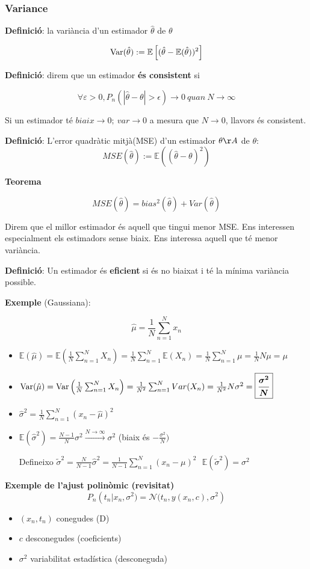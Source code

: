\subsubsection{Variance}
\textbf{Definició}: la variància d'un estimador $\hat{\theta}$ de $\theta$

$$
\operatorname{Var}(\hat{\theta}) := \mathbb{E}\left[(\hat{\theta} - \mathbb{E}(\hat{\theta}))^2\right]
$$

\textbf{Definició}: direm que un estimador \textbf{és consistent} si

$$
\forall\varepsilon>0, P_n(|\hat{\theta} - \theta| > \epsilon) \rightarrow 0\ quan\ N \to \infty
$$

Si un estimador té $biaix \rightarrow 0;\ var\rightarrow0$ a mesura que $N\rightarrow0$, llavors és consistent.

\textbf{Definició}: L'error quadràtic mitjà(MSE) d'un estimador $\theta\AA$ de $\theta$:
$$
MSE(\hat{\theta}) := \mathbb{E}\left((\hat{\theta}-\theta)^2\right)
$$

\textbf{Teorema}

$$
MSE(\hat{\theta}) = bias^2(\hat{\theta}) + Var(\hat{\theta})
$$


Direm que el millor estimador és aquell que tingui menor MSE. Ens interessen especialment els estimadors sense biaix. Ens interessa aquell que té menor variància. 

\textbf{Definició}: Un estimador és \textbf{eficient} si és no biaixat i té la mínima variància possible.

\textbf{Exemple} (Gaussiana):

$$
\boxed{\hat{\mu}=\frac{1}{N}\sum_{n=1}^N x_n}
$$

\begin{itemize}
	\item $\mathbb{E}(\hat{\mu}) = \mathbb{E}\left(\frac{1}{N}\sum_{n=1}^N X_n\right)=\frac{1}{N}\sum_{n=1}^N \mathbb{E}(X_n) = \frac{1}{N}\sum_{n=1}^N \mu = \frac{1}{N}N\mu = \mu$
	
	\item $\operatorname{Var}(\hat{\mu}) = \operatorname{Var}\left(\frac{1}{N}\sum_{n=1}^N X_n\right) = 
	\frac{1}{N^2}\sum_{n=1}^N Var(X_n) = \frac{1}{N^2}N\sigma^2 = \boxed{ \boldsymbol{\frac{\sigma^2}{N}}}$
	
	\item $\hat{\sigma}^2 = \frac{1}{N}\sum_{n=1}^N(x_n-\hat{\mu})^2$
	
	\item $\mathbb{E}(\hat{\sigma}^2) = \frac{N-1}{N}\sigma^2 \xrightarrow{N\to\infty} \sigma^2$ (biaix és $-\frac{\sigma^2}{N})$
	
	Defineixo $\tilde{\sigma}^2 = \frac{N}{N-1}\hat{\sigma}^2 = \frac{1}{N-1}\sum_{n=1}^N(x_n - \mu)^2 \ \ \  \mathbb{E}(\tilde{\sigma}^2) = \sigma^2$
\end{itemize}


\textbf{Exemple de l'ajust polinòmic (revisitat)}
$$
P_n\left(t_n|x_n, \sigma^2)=\mathcal{N}(t_n, y(x_n, c), \sigma^2\right)
$$

\begin{itemize}
	\item $(x_n, t_n)$ conegudes (D)
	\item $c$ desconegudes (coeficients)
	\item $\sigma^2$ variabilitat estadística (desconeguda)
\end{itemize}
